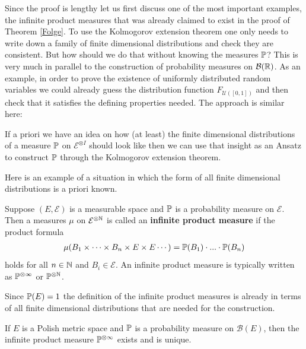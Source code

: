 Since the proof is lengthy let us first discuss one of the most important examples, the infinite product measures that was already claimed to exist in the proof of Theorem \ref{Folge}. To use the Kolmogorov extension theorem one only needs to write down a family of finite dimensional distributions and check they are consistent. But how should we do that without knowing the measures $\P$? This is very much in parallel to the construction of probability measures on $\mathcal B(\R)$. As an example, in order to prove the existence of uniformly distributed random variables we could already guess the distribution function $F_{\mathcal U([0,1])}$ and then check that it satisfies the defining properties needed. The approach is similar here:
\begin{ltipp}
	If a priori we have an idea on how (at least) the finite dimensional distributions of a measure $\P$ on $\mathcal E^{\otimes I}$ should look like then we can use that insight as an Ansatz to construct $\P$ through the Kolmogorov extension theorem.
\end{ltipp}
Here is an example of a situation in which the form of all finite dimensional distributions is a priori known.
\begin{ldef}
	\begin{deff}
		Suppose $(E, \mathcal E)$ is a measurable space and $\P$ is a probability measure on $\mathcal E$. Then a measures $\mu$ on $\mathcal E^{\otimes \N}$ is called an \textbf{infinite product measure} if the product formula
		\begin{align}\label{produkt}
			\mu(B_1\times\cdots \times B_n\times E\times E\cdots)=\P(B_1)\cdot ... \cdot \P(B_n)
		\end{align}
		holds for all $n\in\N$ and $B_i\in \mathcal E$. An infinite product measure is typically written as $\P^{\otimes \infty}$ or $\P^{\otimes \N}$.
	\end{deff}
\end{ldef}
Since $\P(E)=1$ the definition of the infinite product measures is already in  terms of all finite dimensional distributions that are needed for the construction.
\begin{llemma}
	\begin{theorem}
		If $E$ is a Polish metric space and $\P$ is a probability measure on $\mathcal B(E)$, then the infinite product measure $\P^{\otimes \infty}$ exists and is unique.
	\end{theorem}
\end{llemma}
